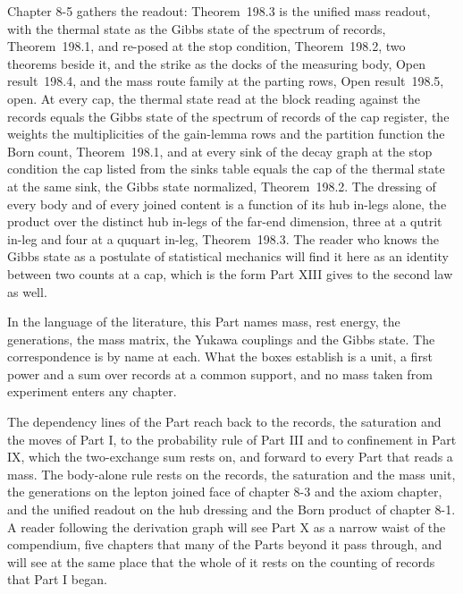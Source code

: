 Chapter 8-5 gathers the readout: Theorem~198.3 is the unified mass readout, with the thermal state as the Gibbs state of the spectrum of records, Theorem~198.1, and re-posed at the stop condition, Theorem~198.2, two theorems beside it, and the strike as the docks of the measuring body, Open result~198.4, and the mass route family at the parting rows, Open result~198.5, open. At every cap, the thermal state read at the block reading against the records equals the Gibbs state of the spectrum of records of the cap register, the weights the multiplicities of the gain-lemma rows and the partition function the Born count, Theorem~198.1, and at every sink of the decay graph at the stop condition the cap listed from the sinks table equals the cap of the thermal state at the same sink, the Gibbs state normalized, Theorem~198.2. The dressing of every body and of every joined content is a function of its hub in-legs alone, the product over the distinct hub in-legs of the far-end dimension, three at a qutrit in-leg and four at a ququart in-leg, Theorem~198.3. The reader who knows the Gibbs state as a postulate of statistical mechanics will find it here as an identity between two counts at a cap, which is the form Part XIII gives to the second law as well.

In the language of the literature, this Part names mass, rest energy, the generations, the mass matrix, the Yukawa couplings and the Gibbs state. The correspondence is by name at each. What the boxes establish is a unit, a first power and a sum over records at a common support, and no mass taken from experiment enters any chapter.

The dependency lines of the Part reach back to the records, the saturation and the moves of Part I, to the probability rule of Part III and to confinement in Part IX, which the two-exchange sum rests on, and forward to every Part that reads a mass. The body-alone rule rests on the records, the saturation and the mass unit, the generations on the lepton joined face of chapter 8-3 and the axiom chapter, and the unified readout on the hub dressing and the Born product of chapter 8-1. A reader following the derivation graph will see Part X as a narrow waist of the compendium, five chapters that many of the Parts beyond it pass through, and will see at the same place that the whole of it rests on the counting of records that Part I began.
